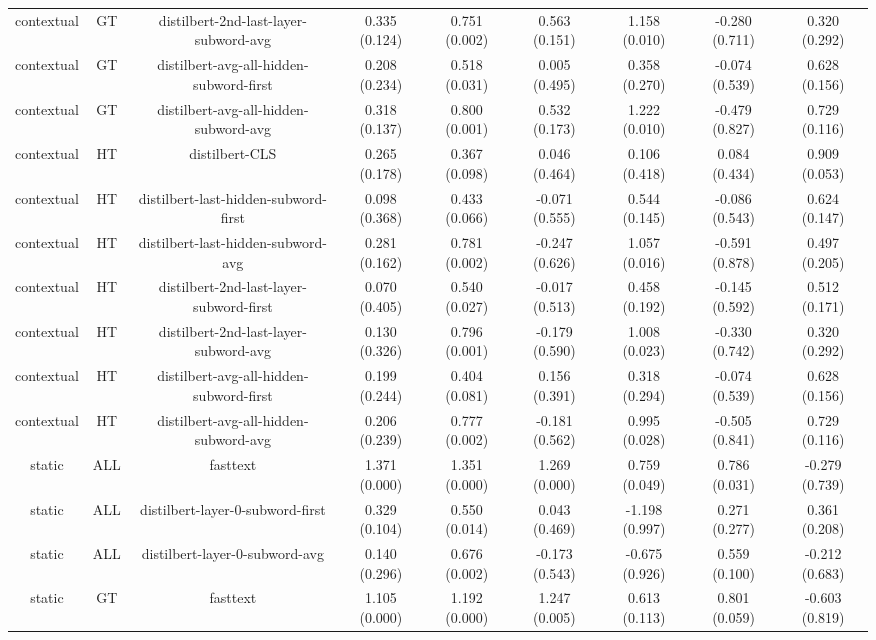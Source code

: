 \begin{sidewaystable}[htb]
\begin{tabular}{@{}ccccccccc@{}}
        contextual & GT & distilbert-2nd-last-layer-subword-avg & 0.335 (0.124) & 0.751 (0.002) & 0.563 (0.151) & 1.158 (0.010) & -0.280 (0.711) & 0.320 (0.292) \\
        contextual & GT & distilbert-avg-all-hidden-subword-first & 0.208 (0.234) & 0.518 (0.031) & 0.005 (0.495) & 0.358 (0.270) & -0.074 (0.539) & 0.628 (0.156) \\
        contextual & GT & distilbert-avg-all-hidden-subword-avg & 0.318 (0.137) & 0.800 (0.001) & 0.532 (0.173) & 1.222 (0.010) & -0.479 (0.827) & 0.729 (0.116) \\
        contextual & HT & distilbert-CLS & 0.265 (0.178) & 0.367 (0.098) & 0.046 (0.464) & 0.106 (0.418) & 0.084 (0.434) & 0.909 (0.053) \\
        contextual & HT & distilbert-last-hidden-subword-first & 0.098 (0.368) & 0.433 (0.066) & -0.071 (0.555) & 0.544 (0.145) & -0.086 (0.543) & 0.624 (0.147) \\
        contextual & HT & distilbert-last-hidden-subword-avg & 0.281 (0.162) & 0.781 (0.002) & -0.247 (0.626) & 1.057 (0.016) & -0.591 (0.878) & 0.497 (0.205) \\
        contextual & HT & distilbert-2nd-last-layer-subword-first & 0.070 (0.405) & 0.540 (0.027) & -0.017 (0.513) & 0.458 (0.192) & -0.145 (0.592) & 0.512 (0.171) \\
        contextual & HT & distilbert-2nd-last-layer-subword-avg & 0.130 (0.326) & 0.796 (0.001) & -0.179 (0.590) & 1.008 (0.023) & -0.330 (0.742) & 0.320 (0.292) \\
        contextual & HT & distilbert-avg-all-hidden-subword-first & 0.199 (0.244) & 0.404 (0.081) & 0.156 (0.391) & 0.318 (0.294) & -0.074 (0.539) & 0.628 (0.156) \\
        contextual & HT & distilbert-avg-all-hidden-subword-avg & 0.206 (0.239) & 0.777 (0.002) & -0.181 (0.562) & 0.995 (0.028) & -0.505 (0.841) & 0.729 (0.116) \\
        static & ALL & fasttext & 1.371 (0.000) & 1.351 (0.000) & 1.269 (0.000) & 0.759 (0.049) & 0.786 (0.031) & -0.279 (0.739) \\
        static & ALL & distilbert-layer-0-subword-first & 0.329 (0.104) & 0.550 (0.014) & 0.043 (0.469) & -1.198 (0.997) & 0.271 (0.277) & 0.361 (0.208) \\
        static & ALL & distilbert-layer-0-subword-avg & 0.140 (0.296) & 0.676 (0.002) & -0.173 (0.543) & -0.675 (0.926) & 0.559 (0.100) & -0.212 (0.683) \\
        static & GT & fasttext & 1.105 (0.000) & 1.192 (0.000) & 1.247 (0.005) & 0.613 (0.113) & 0.801 (0.059) & -0.603 (0.819) \\

\end{tabular}
\end{sidewaystable}
